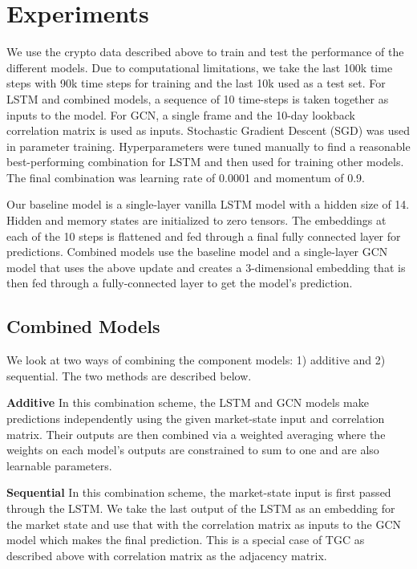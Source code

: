 \section{Experiments}

We use the crypto data described above to train and test the performance of the different models. Due to computational limitations, we take the last 100k time steps with 90k time steps for training and the last 10k used as a test set. For LSTM and combined models, a sequence of 10 time-steps is taken together as inputs to the model. For GCN, a single frame and the 10-day lookback correlation matrix is used as inputs. Stochastic Gradient Descent (SGD) was used in parameter training. Hyperparameters were tuned manually to find a reasonable best-performing combination for LSTM and then used for training other models. The final combination was learning rate of 0.0001 and momentum of 0.9.

Our baseline model is a single-layer vanilla LSTM model with a hidden size of 14. Hidden and memory states are initialized to zero tensors. The embeddings at each of the 10 steps is flattened and fed through a final fully connected layer for predictions. Combined models use the baseline model and a single-layer GCN model that uses the above update and creates a 3-dimensional embedding that is then fed through a fully-connected layer to get the model's prediction.

\subsection{Combined Models}

We look at two ways of combining the component models: 1) additive and 2) sequential. The two methods are described below.

\textbf{Additive} In this combination scheme, the LSTM and GCN models make predictions independently using the given market-state input and correlation matrix. Their outputs are then combined via a weighted averaging where the weights on each model's outputs are constrained to sum to one and are also learnable parameters.

\textbf{Sequential} In this combination scheme, the market-state input is first passed through the LSTM. We take the last output of the LSTM as an embedding for the market state and use that with the correlation matrix as inputs to the GCN model which makes the final prediction. This is a special case of TGC as described above with correlation matrix as the adjacency matrix.

